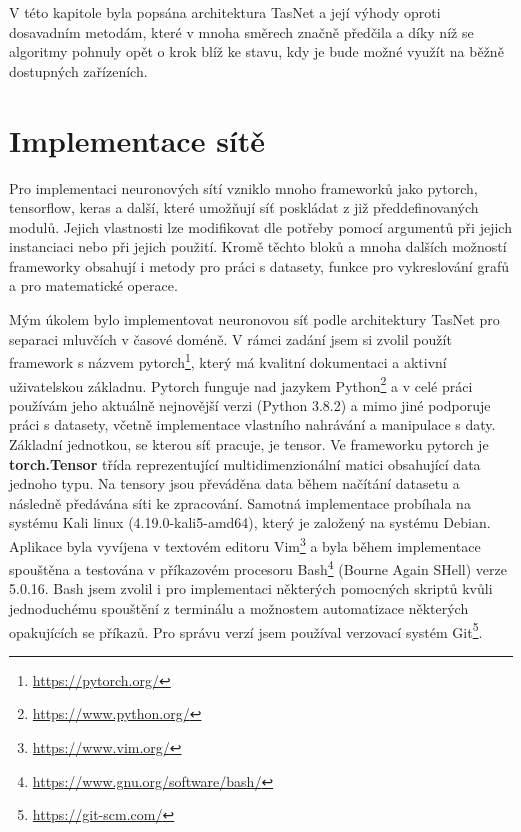 V této kapitole byla popsána architektura TasNet a její výhody oproti dosavadním metodám, které v mnoha směrech značně předčila a díky níž se algoritmy pohnuly opět o krok blíž ke stavu, kdy je bude možné využít na běžně dostupných zařízeních.



\chapter{Implementace sítě}
\label{implementace}
Pro implementaci neuronových sítí vzniklo mnoho frameworků jako pytorch, tensorflow, keras a další, které umožňují síť poskládat z již předdefinovaných modulů. Jejich vlastnosti lze modifikovat dle potřeby pomocí argumentů při jejich instanciaci nebo při jejich použití. Kromě těchto bloků a mnoha dalších možností frameworky obsahují i metody pro práci s datasety, funkce pro vykreslování grafů a pro matematické operace.

Mým úkolem bylo implementovat neuronovou síť podle architektury TasNet pro separaci mluvčích v časové doméně. V rámci zadání jsem si zvolil použít framework s názvem pytorch\footnote{\url{https://pytorch.org/}}, který má kvalitní dokumentaci a aktivní uživatelskou základnu. Pytorch funguje nad jazykem Python\footnote{\url{https://www.python.org/}} a v celé práci používám jeho aktuálně nejnovější verzi (Python 3.8.2) a mimo jiné podporuje práci s datasety, včetně implementace vlastního nahrávání a manipulace s daty. Základní jednotkou, se kterou síť pracuje, je tensor. Ve frameworku pytorch je \textbf{torch.Tensor} třída reprezentující multidimenzionální matici obsahující data jednoho typu. Na tensory jsou převáděna data během načítání datasetu a následně předávána síti ke zpracování. Samotná implementace probíhala na systému Kali linux (4.19.0-kali5-amd64), který je založený na systému Debian. Aplikace byla vyvíjena v textovém editoru Vim\footnote{\url{https://www.vim.org/}} a byla během implementace spouštěna a testována v příkazovém procesoru Bash\footnote{\url{https://www.gnu.org/software/bash/}} (Bourne Again SHell) verze 5.0.16. Bash jsem zvolil i pro implementaci některých pomocných skriptů kvůli jednoduchému spouštění z terminálu a možnostem automatizace některých opakujících se příkazů. Pro správu verzí jsem používal verzovací systém Git\footnote{\url{https://git-scm.com/}}.

